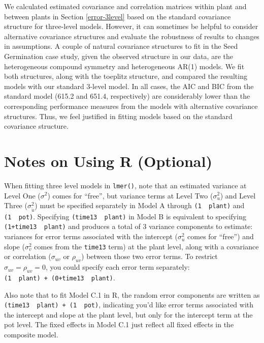 \documentclass[
]{krantz}
\begin{document}
We calculated estimated covariance and correlation matrices within plant and between plants in Section \ref{error-3level} based on the standard covariance structure for three-level models. However, it can sometimes be helpful to consider alternative covariance structures and evaluate the robustness of results to changes in assumptions. A couple of natural covariance structures to fit in the Seed Germination case study, given the observed structure in our data, are the heterogeneous compound symmetry and heterogeneous AR(1) models. We fit both structures, along with the toeplitz structure, and compared the resulting models with our standard 3-level model. In all cases, the AIC and BIC from the standard model (615.2 and 651.4, respectively) are considerably lower than the corresponding performance measures from the models with alternative covariance structures. Thus, we feel justified in fitting models based on the standard covariance structure.

\hypertarget{usingR3}{%
\section{Notes on Using R (Optional)}\label{usingR3}}

When fitting three level models in \texttt{lmer()}, note that an estimated variance at Level One (\(\sigma^{2}\)) comes for ``free'', but variance terms at Level Two (\(\sigma_{u}^{2}\)) and Level Three (\(\sigma_{\tilde{u}}^{2}\)) must be specified separately in Model A through \texttt{(1\ \textbar{}\ plant)} and \texttt{(1\ \textbar{}\ pot)}. Specifying \texttt{(time13\ \textbar{}\ plant)} in Model B is equivalent to specifying \texttt{(1+time13\ \textbar{}\ plant)} and produces a total of 3 variance components to estimate: variances for error terms associated with the intercept (\(\sigma_{u}^{2}\) comes for ``free'') and slope (\(\sigma_{v}^{2}\) comes from the \texttt{time13} term) at the plant level, along with a covariance or correlation (\(\sigma_{uv}\) or \(\rho_{uv}\)) between those two error terms. To restrict \(\sigma_{uv} = \rho_{uv} = 0\), you could specify each error term separately: \texttt{(1\ \textbar{}\ plant)\ +\ (0+time13\ \textbar{}\ plant)}.

Also note that to fit Model C.1 in R, the random error components are written as \texttt{(time13\ \textbar{}\ plant)\ +\ (1\ \textbar{}\ pot)}, indicating you'd like error terms associated with the intercept and slope at the plant level, but only for the intercept term at the pot level. The fixed effects in Model C.1 just reflect all fixed effects in the composite model.
\end{document}
